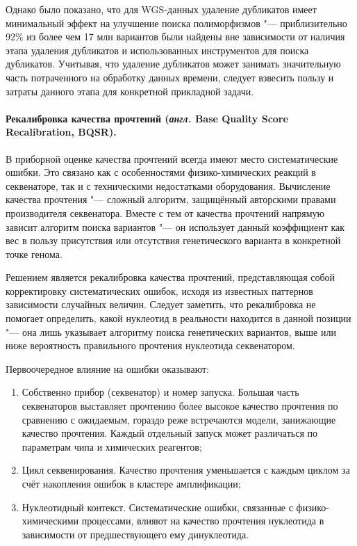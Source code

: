 \documentclass[a4paper,12pt]{article}
\begin{document}
Однако было показано, что для WGS-данных удаление дубликатов имеет минимальный эффект на улучшение поиска полиморфизмов "--- приблизительно 92\% из более чем 17 млн вариантов были найдены вне зависимости от наличия этапа удаления дубликатов и использованных инструментов для поиска дубликатов\cite{Ebbert_2016}.
Учитывая, что удаление дубликатов может занимать значительную часть потраченного на обработку данных времени, следует взвесить пользу и затраты данного этапа для конкретной прикладной задачи.

\paragraph{Рекалибровка качества прочтений (\textit{англ.} Base Quality Score Recalibration, BQSR).}
В приборной оценке качества прочтений всегда имеют место систематические ошибки.
Это связано как с особенностями физико-химических реакций в секвенаторе, так и с техническими недостатками оборудования.
Вычисление качества прочтения "--- сложный алгоритм, защищённый авторскими правами производителя секвенатора.
Вместе с тем от качества прочтений напрямую зависит алгоритм поиска вариантов "--- он использует данный коэффициент как вес в пользу присутствия или отсутствия генетического варианта в конкретной точке генома.

Решением является рекалибровка качества прочтений, представляющая собой корректировку систематических ошибок, исходя из известных паттернов зависимости случайных величин.
Следует заметить, что рекалибровка не помогает определить, какой нуклеотид в реальности находится в данной позиции "--- она лишь указывает алгоритму поиска генетических вариантов, выше или ниже вероятность правильного прочтения нуклеотида секвенатором.

Первоочередное влияние на ошибки оказывают:

\begin{enumerate}
\item Собственно прибор (секвенатор) и номер запуска.
Большая часть секвенаторов выставляет прочтению более высокое качество прочтения по сравнению с ожидаемым, гораздо реже встречаются модели, занижающие качество прочтения\cite{Auwera_2013}.
Каждый отдельный запуск может различаться по параметрам чипа и химических реагентов;
\item Цикл секвенирования.
Качество прочтения уменьшается с каждым циклом за счёт накопления ошибок в кластере амплификации;
\item Нуклеотидный контекст.
Систематические ошибки, связанные с физико-химическими процессами, влияют на качество прочтения нуклеотида в зависимости от предшествующего ему динуклеотида.
\end{enumerate}
\end{document}
